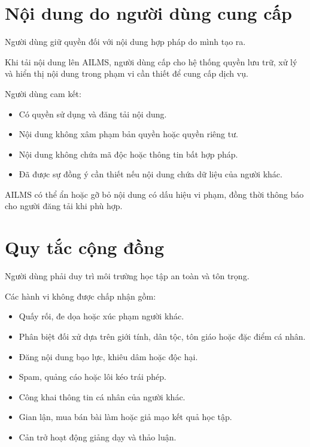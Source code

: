 \documentclass[12pt,a4paper]{article}
\begin{document}
\section{Nội dung do người dùng cung cấp}

Người dùng giữ quyền đối với nội dung hợp pháp do mình tạo ra.

Khi tải nội dung lên AILMS, người dùng cấp cho hệ thống quyền lưu trữ,
xử lý và hiển thị nội dung trong phạm vi cần thiết để cung cấp dịch vụ.

Người dùng cam kết:

\begin{itemize}
    \item Có quyền sử dụng và đăng tải nội dung.
    \item Nội dung không xâm phạm bản quyền hoặc quyền riêng tư.
    \item Nội dung không chứa mã độc hoặc thông tin bất hợp pháp.
    \item Đã được sự đồng ý cần thiết nếu nội dung chứa dữ liệu của người khác.
\end{itemize}

AILMS có thể ẩn hoặc gỡ bỏ nội dung có dấu hiệu vi phạm,
đồng thời thông báo cho người đăng tải khi phù hợp.

\section{Quy tắc cộng đồng}

Người dùng phải duy trì môi trường học tập an toàn và tôn trọng.

Các hành vi không được chấp nhận gồm:

\begin{itemize}
    \item Quấy rối, đe dọa hoặc xúc phạm người khác.
    \item Phân biệt đối xử dựa trên giới tính, dân tộc, tôn giáo hoặc đặc điểm cá nhân.
    \item Đăng nội dung bạo lực, khiêu dâm hoặc độc hại.
    \item Spam, quảng cáo hoặc lôi kéo trái phép.
    \item Công khai thông tin cá nhân của người khác.
    \item Gian lận, mua bán bài làm hoặc giả mạo kết quả học tập.
    \item Cản trở hoạt động giảng dạy và thảo luận.
\end{itemize}
\end{document}
